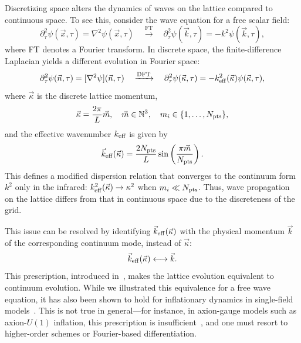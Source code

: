 \documentclass[aps, nofootinbib,superscriptaddress, preprintnumbers, longbibliography]{article}
\begin{document}
Discretizing space alters the dynamics of waves on the lattice compared to continuous space. To see this, consider the wave equation for a free scalar field:
\begin{equation}
\partial_\tau^2 \psi(\vec{x}, \tau) = \nabla^2 \psi(\vec{x}, \tau) \quad \xrightarrow{\text{FT}} \quad \partial_\tau^2 \psi(\vec{k}, \tau) = -k^2 \psi(\vec{k}, \tau),
\end{equation}
where FT denotes a Fourier transform. In discrete space, the finite-difference Laplacian yields a different evolution in Fourier space:
\begin{equation}
\partial_\tau^2 \psi(\vec{n}, \tau) = [\nabla^2 \psi](\vec{n}, \tau) \quad \xrightarrow{\text{DFT}} \quad \partial_\tau^2 \psi(\vec{\kappa}, \tau) = -k_{\rm eff}^2(\vec{\kappa}) \psi(\vec{\kappa}, \tau),
\end{equation}
where $\vec{\kappa}$ is the discrete lattice momentum,
\begin{equation}
\vec{\kappa} = \frac{2\pi}{L} \vec{m}, \quad \vec{m} \in \mathbb{N}^3, \quad m_i \in \{1, \dots, N_{\rm pts}\},
\end{equation}
and the effective wavenumber $k_{\rm eff}$ is given by
\begin{equation}
\label{eq:eff}
\vec{k}_{\rm eff}(\vec{\kappa}) = \frac{2N_{\rm pts}}{L} \sin\left( \frac{\pi \vec{m}}{N_{\rm pts}} \right).
\end{equation}
This defines a modified dispersion relation that converges to the continuum form $k^2$ only in the infrared: $k^2_{\rm eff}(\vec{\kappa}) \to {\kappa}^2$ when $m_i \ll N_{\rm pts}$. Thus, wave propagation on the lattice differs from that in continuous space due to the discreteness of the grid.

This issue can be resolved by identifying $\vec{k}_{\rm eff}(\vec{\kappa})$ with the physical momentum $\vec{k}$ of the corresponding continuum mode, instead of $\vec\kappa$:
\begin{equation}
\vec{k}_{\rm eff}(\vec{\kappa}) \longleftrightarrow \vec{k}.
\end{equation}
This prescription, introduced in~\cite{Caravano:2021pgc}, makes the lattice evolution equivalent to continuum evolution. While we illustrated this equivalence for a free wave equation, it has also been shown to hold for inflationary dynamics in single-field models~\cite{Caravano:2021pgc,Caravano:2022yyv}. This is not true in general—for instance, in axion-gauge models such as axion-$U(1)$ inflation, this prescription is insufficient~\cite{Caravano:2021bfn,Caravano:2022epk}, and one must resort to higher-order schemes or Fourier-based differentiation.
\end{document}
